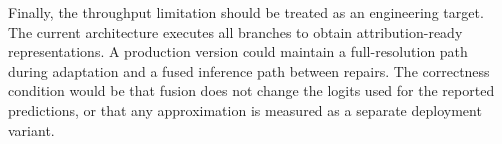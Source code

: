 Finally, the throughput limitation should be treated as an engineering target. The current architecture executes all branches to obtain attribution-ready representations. A production version could maintain a full-resolution path during adaptation and a fused inference path between repairs. The correctness condition would be that fusion does not change the logits used for the reported predictions, or that any approximation is measured as a separate deployment variant.


